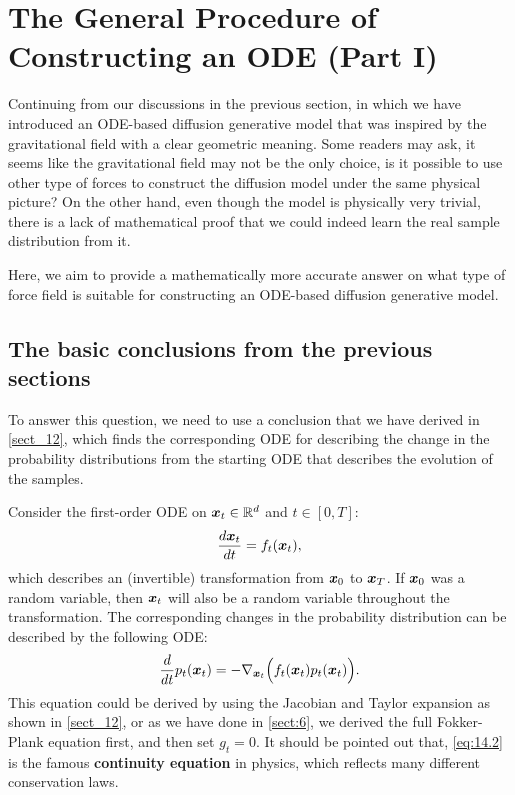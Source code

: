 \section{The General Procedure of Constructing an ODE (Part I)}
\label{sect_14}

Continuing from our discussions in the previous section, in which we have introduced an ODE-based diffusion generative model that was inspired by the gravitational field with a clear geometric meaning. Some readers may ask, it seems like the gravitational field may not be the only choice, is it possible to use other type of forces to construct the diffusion model under the same physical picture? On the other hand, even though the model is physically very trivial, there is a lack of mathematical proof that we could indeed learn the real sample distribution from it. 

Here, we aim to provide a mathematically more accurate answer on what type of force field is suitable for constructing an ODE-based diffusion generative model.

\subsection{The basic conclusions from the previous sections}

To answer this question, we need to use a conclusion that we have derived in \cref{sect_12}, which finds the corresponding ODE for describing the change in the probability distributions from the starting ODE that describes the evolution of the samples. 

Consider the first-order ODE on $\bm{x}_{t}\in\mathbb{R}^d$ and $t\in[0,T]$:
\begin{equation}
    \label{eq:14.1}
    \frac{d\bm{x}_{t}}{dt}=f_t(\bm{x}_{t}),
\end{equation}
which describes an (invertible) transformation from $\bm{x}_0$ to $\bm{x}_T$. If $\bm{x}_0$ was a random variable, then $\bm{x}_{t}$ will also be a random variable throughout the transformation. The corresponding changes in the probability distribution can be described by the following ODE:
\begin{equation}
    \label{eq:14.2}
    \frac{d}{dt}p_t(\bm{x}_{t})=-\nabla_{\bm{x}_{t}} \Bigl(f_t(\bm{x}_{t})p_t(\bm{x}_{t})\Bigr).
\end{equation}
This equation could be derived by using the Jacobian and Taylor expansion as shown in \cref{sect_12}, or as we have done in \cref{sect:6}, we derived the full Fokker-Plank equation first, and then set $g_t=0$. It should be pointed out that, \cref{eq:14.2} is the famous \textbf{continuity equation} in physics, which reflects many different conservation laws.

